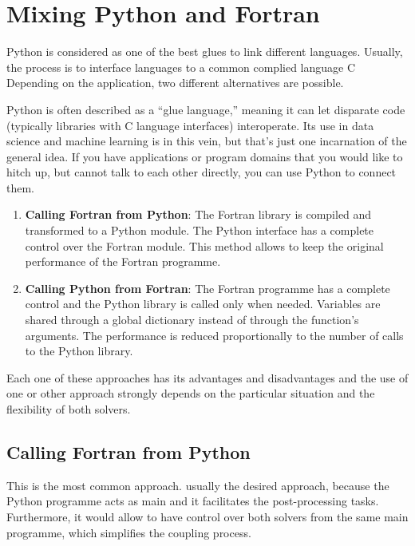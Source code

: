 

\chapter{Mixing Python and Fortran} 
Python is considered as one of the best glues to link different languages. 
Usually, the process is to interface languages to a common complied language C
Depending on the application, two different alternatives are possible. 

Python is often described as a “glue language,” 
meaning it can let disparate code 
(typically libraries with C language interfaces) interoperate. 
Its use in data science and machine learning is in this vein,
but that’s just one incarnation of the general idea. 
If you have applications or program domains that you would like to hitch up, 
but cannot talk to each other directly, you can use Python to connect them.


\begin{enumerate}
    \item \textbf{Calling Fortran from Python}: The Fortran library is compiled and transformed to a Python module. The Python interface has 
    a complete 
    control over the Fortran module. This method allows to keep the original performance of the Fortran programme.
    
    \item \textbf{Calling Python from Fortran}: 
    The Fortran programme has a complete control and the Python library is called only when needed. Variables 
    are shared through a global dictionary instead of through the function's arguments. The performance is reduced proportionally to the 
    number of calls to the Python library.
\end{enumerate}

Each one of these approaches has its advantages and disadvantages and the use of one or other approach strongly depends on the particular 
situation and the flexibility of both solvers.

\section{Calling Fortran from Python} 
This is the most common approach. 
usually the desired approach, 
because the Python programme acts as main and it facilitates the post-processing tasks. 
Furthermore, it would allow to have control over both solvers from the same main programme, 
which simplifies the coupling process.

